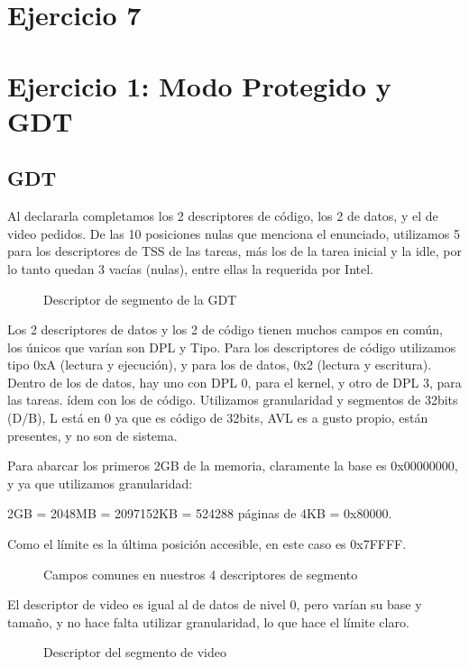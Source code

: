 \documentclass[10pt, a4paper]{article}
\begin{document}
\section{Ejercicio 7}


\section{Ejercicio 1: Modo Protegido y GDT}
\subsection{GDT}
Al declararla completamos los 2 descriptores de código, los 2 de datos, y el de video pedidos. De las 10 posiciones nulas que menciona el enunciado, utilizamos 5 para los descriptores de TSS de las tareas, más los de la tarea inicial y la idle, por lo tanto quedan 3 vacías (nulas), entre ellas la requerida por Intel.

		\begin{figure}[H]
	  		\centering
			\caption{Descriptor de segmento de la GDT}
			\label{fig:descriptorGDT}
		\end{figure}

Los 2 descriptores de datos y los 2 de código tienen muchos campos en común, los únicos que varían son DPL y Tipo. Para los descriptores de código utilizamos tipo 0xA (lectura y ejecución), y para los de datos, 0x2 (lectura y escritura). Dentro de los de datos, hay uno con DPL 0, para el kernel, y otro de DPL 3, para las tareas. ídem con los de código.
Utilizamos granularidad y segmentos de 32bits (D/B), L está en 0 ya que es código de 32bits, AVL es a gusto propio, están presentes, y no son de sistema.

Para abarcar los primeros 2GB de la memoria, claramente la base es 0x00000000, y ya que utilizamos granularidad:

\begin{center}
2GB = 2048MB = 2097152KB = 524288 páginas de 4KB = 0x80000.
\end{center}

Como el límite es la última posición accesible, en este caso es 0x7FFFF.
		\begin{figure}[H]
	  		\centering
			\caption{Campos comunes en nuestros 4 descriptores de segmento}
			\label{fig:descriptorGDTCamposComunes}
		\end{figure}
		
El descriptor de video es igual al de datos de nivel 0, pero varían su base y tamaño, y no hace falta utilizar granularidad, lo que hace el límite claro.
		\begin{figure}[H]
	  		\centering
			\caption{Descriptor del segmento de video}
			\label{fig:descriptorVideo}
		\end{figure}
		
\end{document}
